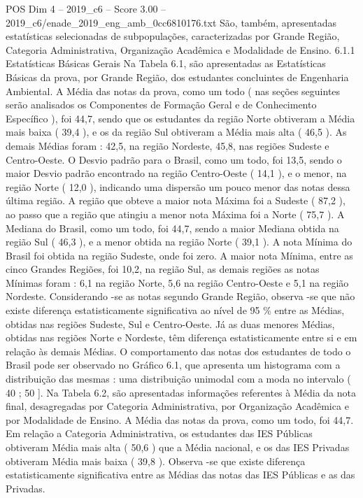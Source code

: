 \begin{textsample}{POS Dim 4 – 2019\_c6 – Score 3.00 – 2019\_c6/enade\_2019\_eng\_amb\_0cc6810176.txt}
São, também, apresentadas estatísticas selecionadas de subpopulações, caracterizadas por Grande Região, Categoria Administrativa, Organização Acadêmica e Modalidade de Ensino. 6.1.1 Estatísticas Básicas Gerais Na Tabela 6.1, são apresentadas as Estatísticas Básicas da prova, por Grande Região, dos estudantes concluintes de Engenharia Ambiental.
A Média das notas da prova, como um todo ( nas seções seguintes serão analisados os Componentes de Formação Geral e de Conhecimento Específico ), foi 44,7, sendo que os estudantes da região Norte obtiveram a Média mais baixa ( 39,4 ), e os da região Sul obtiveram a Média mais alta ( 46,5 ).
As demais Médias foram : 42,5, na região Nordeste, 45,8, nas regiões Sudeste e Centro-Oeste.
O Desvio padrão para o Brasil, como um todo, foi 13,5, sendo o maior Desvio padrão encontrado na região Centro-Oeste ( 14,1 ), e o menor, na região Norte ( 12,0 ), indicando uma dispersão um pouco menor das notas dessa última região.
A região que obteve a maior nota Máxima foi a Sudeste ( 87,2 ), ao passo que a região que atingiu a menor nota Máxima foi a Norte ( 75,7 ).
A Mediana do Brasil, como um todo, foi 44,7, sendo a maior Mediana obtida na região Sul ( 46,3 ), e a menor obtida na região Norte ( 39,1 ).
A nota Mínima do Brasil foi obtida na região Sudeste, onde foi zero.
A maior nota Mínima, entre as cinco Grandes Regiões, foi 10,2, na região Sul, as demais regiões as notas Mínimas foram : 6,1 na região Norte, 5,6 na região Centro-Oeste e 5,1 na região Nordeste.
Considerando -se as notas segundo Grande Região, observa -se que não existe diferença estatisticamente significativa ao nível de 95 \% entre as Médias, obtidas nas regiões Sudeste, Sul e Centro-Oeste.
Já as duas menores Médias, obtidas nas regiões Norte e Nordeste, têm diferença estatisticamente entre si e em relação às demais Médias.
O comportamento das notas dos estudantes de todo o Brasil pode ser observado no Gráfico 6.1, que apresenta um histograma com a distribuição das mesmas : uma distribuição unimodal com a moda no intervalo ( 40 ; 50 ].
Na Tabela 6.2, são apresentadas informações referentes à Média da nota final, desagregadas por Categoria Administrativa, por Organização Acadêmica e por Modalidade de Ensino.
A Média das notas da prova, como um todo, foi 44,7.
Em relação a Categoria Administrativa, os estudantes das IES Públicas obtiveram Média mais alta ( 50,6 ) que a Média nacional, e os das IES Privadas obtiveram Média mais baixa ( 39,8 ).
Observa -se que existe diferença estatisticamente significativa entre as Médias das notas das IES Públicas e as das Privadas.

\end{textsample}
